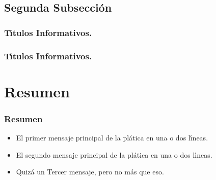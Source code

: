 \documentclass{beamer}  %
\begin{document}
\subsection{Segunda Subsecci\'on}

\begin{frame}
  \frametitle{T\'{\i}tulos Informativos.}
\end{frame}

\begin{frame}
  \frametitle{T\'{\i}tulos Informativos.}
\end{frame}


\section*{Resumen}

\begin{frame}
  \frametitle{Resumen}

  \begin{itemize}
  \item El \alert{primer mensaje principal} de la pl\'atica en una o
    dos l\'{\i}neas.
  \item El \alert{segundo mensaje principal} de la pl\'atica en una o
    dos l\'{\i}neas.
  \item Quiz\'a un \alert{Tercer mensaje}, pero no m\'as que eso.
  \end{itemize}
  
\end{frame}
\end{document}
